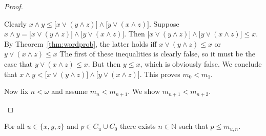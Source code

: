 \begin{proof}
\begin{itemize}
  Clearly 
  $x\wedge y \leqslant \bigl[x \vee (y\wedge z)\bigr]\wedge \bigl[y \vee (x\wedge z)\bigr]$. 
  Suppose 
  $x\wedge y = \bigl[x \vee (y\wedge z)\bigr]\wedge \bigl[y \vee (x\wedge z)\bigr]$. 
  Then $\bigl[x \vee (y\wedge z)\bigr]\wedge \bigl[y \vee (x\wedge z)\bigr]\leqslant x$.
  By Theorem~\ref{thm:wordprob}, the latter holds iff
  $x \vee (y\wedge z)\leqslant x$ or
  $y \vee (x\wedge z)\leqslant x$
  The first of these inequalities is clearly false, so it must be the case that 
  $y \vee (x\wedge z)\leqslant x$.  But then $y \leqslant x$, which is obviously false.  
  We conclude that
  $x\wedge y < \bigl[x \vee (y\wedge z)\bigr]\wedge \bigl[y \vee (x\wedge z)\bigr]$.
  This proves $m_0 < m_1$.

  Now fix $n < \omega$ and assume $m_n < m_{n+1}$.
  We show $m_{n+1} < m_{n+2}$.

\end{itemize}
\end{proof}

\begin{comment}
  $\downarrow$ \textit{begin scratch work} $\downarrow$

  $m_{n} := (x_n \wedge y_n) \vee (x_n \wedge z_n)\vee (y_n \wedge z_n)$,

  $m_{n+1} := (x_{n+1} \wedge y_{n+1}) \vee (x_{n+1} \wedge z_{n+1})\vee (y_{n+1} \wedge z_{n+1})$,

  By the first Case above, $u_n < u_{n+1}$.
  
  $\uparrow$ \textit{end scratch work} $\uparrow$
\end{comment}


\begin{lemma}\label{lem:2} %
For all $u \in \{x, y, z\}$ and $p \in C_u \cup C_0$ there exists $n \in \mathbb N$ such that $p\leqslant m_{u,n}$.  
\end{lemma}

